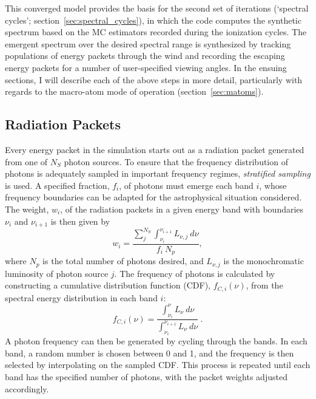 This converged model provides the basis for the second set of
iterations (`spectral cycles'; section~\ref{sec:spectral_cycles}), 
in which the code computes the synthetic spectrum based on the 
MC estimators recorded during the ionization cycles. 
The emergent spectrum over the desired spectral range is synthesized by 
tracking populations of energy packets through the wind and recording 
the escaping energy packets for
a number of user-specified viewing angles.  In the ensuing sections,
I will describe each of the above steps in more detail, particularly
with regards to the macro-atom mode of operation (section~\ref{sec:matoms}).


\subsection{Radiation Packets}
\label{sec:packets}
Every energy packet in the simulation starts out as a radiation packet generated
from one of $N_S$ photon sources. To ensure that the frequency distribution
of photons is adequately sampled in important frequency regimes, 
{\em stratified sampling} is used. A specified fraction, $f_i$,
of photons must emerge each band $i$, whose frequency boundaries
can be adapted for the astrophysical situation considered. 
The weight, $w_i$, of the radiation packets in a given energy band with boundaries
$\nu_i$ and $\nu_{i+1}$ is then given by
\begin{equation}
w_i = \frac{\sum_j^{N_S} \int_{\nu_i}^{\nu_{i+1}} L_{\nu,j}~d\nu}{f_i~N_p},
\end{equation}
where $N_p$ is the total number of photons desired, 
and $L_{\nu,j}$ is the monochromatic 
luminosity of photon source $j$. 
The frequency of photons is calculated by constructing a 
cumulative distribution function (CDF), $f_{C,i}(\nu)$,
from the spectral energy distribution in each band $i$: 
\begin{equation}
f_{C,i} (\nu) = 
\frac{\int_{\nu_i}^{\nu} L_\nu~d\nu}
{\int_{\nu_i}^{\nu_{i+1}} L_\nu~d\nu} ~.
\end{equation}
A photon frequency can then be generated by cycling through the bands. In each band,
a random number is chosen between 0 and 1, and the frequency is 
then selected by interpolating on the sampled CDF. This process is repeated until 
each band has the specified number of photons, with the packet
weights adjusted accordingly.

